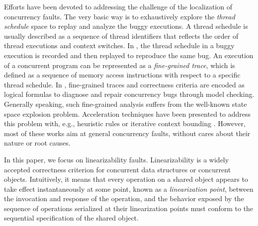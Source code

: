 \documentclass[runningheads]{llncs}
\begin{document}
Efforts have been devoted to addressing the challenge of the localization of concurrency faults. The very basic way is to exhaustively explore the \textit{thread schedule} space to replay and analyze the buggy executions.
A thread schedule is usually described as a sequence of thread identifiers that reflects the order of thread executions and context switches. 
In \cite{Choi2000Deterministic,DBLP:journals/entcs/Stoller02,DBLP:journals/concurrency/EdelsteinFGNRU03}, the thread schedule in a buggy execution is recorded and then replayed to reproduce the same bug. 
An execution of a concurrent program can be represented as a \textit{fine-grained trace}, which is defined as a sequence of memory access instructions with respect to a specific thread schedule. 
In \cite{DBLP:conf/issta/KhoshnoodKW15}, fine-grained traces and correctness criteria are encoded as logical formulas to diagnose and repair concurrency bugs through model checking. Generally speaking, such fine-grained analysis suffers from the well-known state space explosion problem. Acceleration techniques have been presented to address this problem with, e.g., heuristic rules \cite{Ben2003Heuristics} or iterative context bounding \cite{DBLP:conf/pldi/MusuvathiQ07}. However, most of these works aim at general concurrency faults, without cares about their nature or root causes.

In this paper, we focus on linearizability faults. Linearizability \cite{DBLP:journals/toplas/HerlihyW90} is a widely accepted correctness criterion for concurrent data structures or concurrent objects. 
Intuitively, it means that every operation on a shared object appears to take effect instantaneously at some point, known as a \textit{linearization point}, 
between the invocation and response of the operation, and the behavior exposed by the sequence of operations serialized at their linearization points must conform to the sequential specification of the shared object.
\end{document}
